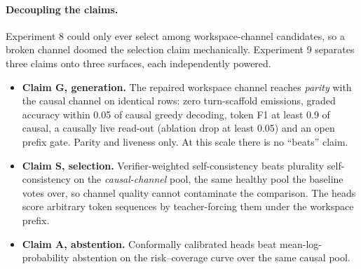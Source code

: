 \documentclass[10pt,a4paper]{article}
\begin{document}
\paragraph{Decoupling the claims.}
Experiment 8 could only ever select among workspace-channel candidates, so a
broken channel doomed the selection claim mechanically. Experiment 9 separates
three claims onto three surfaces, each independently powered.

\begin{itemize}[leftmargin=1.4em]
\item \textbf{Claim G, generation.} The repaired workspace channel reaches
  \emph{parity} with the causal channel on identical rows: zero turn-scaffold
  emissions, graded accuracy within 0.05 of causal greedy decoding, token F1
  at least 0.9 of causal, a causally live read-out (ablation drop at least
  0.05) and an open prefix gate. Parity and liveness only. At this scale
  there is no ``beats'' claim.
\item \textbf{Claim S, selection.} Verifier-weighted self-consistency beats
  plurality self-consistency on the \emph{causal-channel} pool, the same
  healthy pool the baseline votes over, so channel quality cannot contaminate
  the comparison. The heads score arbitrary token sequences by teacher-forcing
  them under the workspace prefix.
\item \textbf{Claim A, abstention.} Conformally calibrated heads beat
  mean-log-probability abstention on the risk--coverage curve over the same
  causal pool.
\end{itemize}
\end{document}
